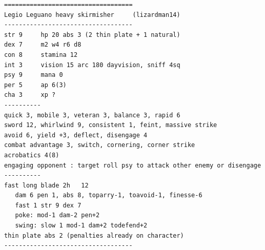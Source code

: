 \goodbreak
\begin{samepage}
\small \begin{verbatim}
===================================
Legio Leguano heavy skirmisher     (lizardman14)
-----------------------------------
str 9     hp 20 abs 3 (2 thin plate + 1 natural)
dex 7     m2 w4 r6 d8
con 8     stamina 12
int 3     vision 15 arc 180 dayvision, sniff 4sq
psy 9     mana 0
per 5     ap 6(3)
cha 3     xp ?
----------
quick 3, mobile 3, veteran 3, balance 3, rapid 6
sword 12, whirlwind 9, consistent 1, feint, massive strike
avoid 6, yield +3, deflect, disengage 4
combat advantage 3, switch, cornering, corner strike
acrobatics 4(8)
engaging opponent : target roll psy to attack other enemy or disengage
----------
fast long blade 2h   12
   dam 6 pen 1, abs 8, toparry-1, toavoid-1, finesse-6
   fast 1 str 9 dex 7
   poke: mod-1 dam-2 pen+2
   swing: slow 1 mod-1 dam+2 todefend+2
thin plate abs 2 (penalties already on character)
-----------------------------------
\end{verbatim} \normalsize
\end{samepage}

\


